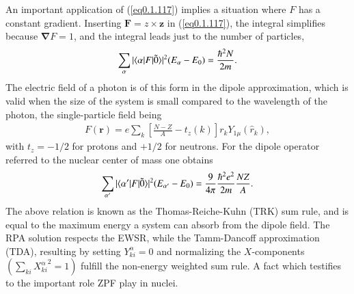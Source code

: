 An important application of (\ref{eq0.1.117}) implies a situation where $F$ has a constant gradient. Inserting $\mathbf F=z\times\mathbf z$ in (\ref{eq0.1.117}), the integral simplifies because $\pmb \nabla F=1$, and the integral leads just to the number of particles,
\begin{align}\label{eq0.1.118}
\sum_{\alpha}|\langle {\alpha|F|\tilde 0} \rangle|^2(E_{\alpha}-E_0)=\frac{\hbar^2N}{2m}.
\end{align}
The electric field of a photon is of this form in the dipole approximation, which is valid when the size of the system is small compared to the wavelength of the photon, the single-particle field being
\begin{align}\label{eq0.1.119}
F(\mathbf r)=e\sum_{k}\left[\frac{N-Z}{A}-t_z(k)\right]r_kY_{1\mu}(\hat r_k),
\end{align}
with $t_z=-1/2$ for protons and $+1/2$ for neutrons. For the dipole operator referred to the nuclear center of mass one obtains
\begin{align}\label{eq0.1.120}
\sum_{\alpha'}|\langle {\alpha'|F|\tilde 0} \rangle|^2(E_{\alpha'}-E_0)=\frac{9}{4\pi}\frac{\hbar^2e^2}{2m}\frac{NZ}{A}.
\end{align}
 The above relation is known as the Thomas-Reiche-Kuhn (TRK) sum rule, and is equal to the maximum energy a system can absorb from the dipole field. The RPA solution respects the EWSR, while the Tamm-Dancoff approximation (TDA), resulting by setting $Y^\alpha_{ki}=0$ and normalizing the $X$-components $(\sum_{ki}{X^{\alpha}_{ki}}^2=1)$ fulfill the non-energy weighted sum rule. A fact which testifies to the important role ZPF play in nuclei.
